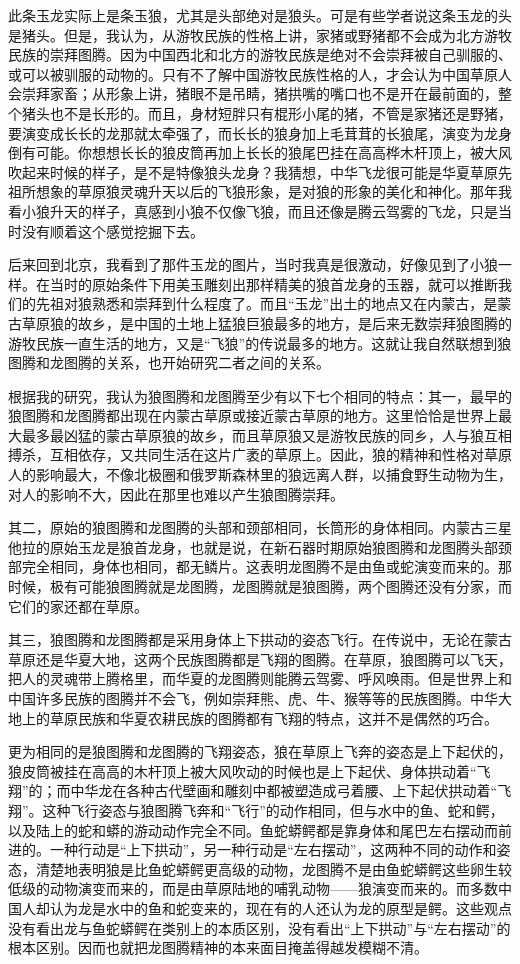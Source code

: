 \par 此条玉龙实际上是条玉狼，尤其是头部绝对是狼头。可是有些学者说这条玉龙的头是猪头。但是，我认为，从游牧民族的性格上讲，家猪或野猪都不会成为北方游牧民族的崇拜图腾。因为中国西北和北方的游牧民族是绝对不会崇拜被自己驯服的、或可以被驯服的动物的。只有不了解中国游牧民族性格的人，才会认为中国草原人会崇拜家畜；从形象上讲，猪眼不是吊睛，猪拱嘴的嘴口也不是开在最前面的，整个猪头也不是长形的。而且，身材短胖只有棍形小尾的猪，不管是家猪还是野猪，要演变成长长的龙那就太牵强了，而长长的狼身加上毛茸茸的长狼尾，演变为龙身倒有可能。你想想长长的狼皮筒再加上长长的狼尾巴挂在高高桦木杆顶上，被大风吹起来时候的样子，是不是特像狼头龙身？我猜想，中华飞龙很可能是华夏草原先祖所想象的草原狼灵魂升天以后的飞狼形象，是对狼的形象的美化和神化。那年我看小狼升天的样子，真感到小狼不仅像飞狼，而且还像是腾云驾雾的飞龙，只是当时没有顺着这个感觉挖掘下去。
\par 后来回到北京，我看到了那件玉龙的图片，当时我真是很激动，好像见到了小狼一样。在当时的原始条件下用美玉雕刻出那样精美的狼首龙身的玉器，就可以推断我们的先祖对狼熟悉和崇拜到什么程度了。而且“玉龙”出土的地点又在内蒙古，是蒙古草原狼的故乡，是中国的土地上猛狼巨狼最多的地方，是后来无数崇拜狼图腾的游牧民族一直生活的地方，又是“飞狼”的传说最多的地方。这就让我自然联想到狼图腾和龙图腾的关系，也开始研究二者之间的关系。
\par 根据我的研究，我认为狼图腾和龙图腾至少有以下七个相同的特点：其一，最早的狼图腾和龙图腾都出现在内蒙古草原或接近蒙古草原的地方。这里恰恰是世界上最大最多最凶猛的蒙古草原狼的故乡，而且草原狼又是游牧民族的同乡，人与狼互相搏杀，互相依存，又共同生活在这片广袤的草原上。因此，狼的精神和性格对草原人的影响最大，不像北极圈和俄罗斯森林里的狼远离人群，以捕食野生动物为生，对人的影响不大，因此在那里也难以产生狼图腾崇拜。
\par 其二，原始的狼图腾和龙图腾的头部和颈部相同，长筒形的身体相同。内蒙古三星他拉的原始玉龙是狼首龙身，也就是说，在新石器时期原始狼图腾和龙图腾头部颈部完全相同，身体也相同，都无鳞片。这表明龙图腾不是由鱼或蛇演变而来的。那时候，极有可能狼图腾就是龙图腾，龙图腾就是狼图腾，两个图腾还没有分家，而它们的家还都在草原。
\par 其三，狼图腾和龙图腾都是采用身体上下拱动的姿态飞行。在传说中，无论在蒙古草原还是华夏大地，这两个民族图腾都是飞翔的图腾。在草原，狼图腾可以飞天，把人的灵魂带上腾格里，而华夏的龙图腾则能腾云驾雾、呼风唤雨。但是世界上和中国许多民族的图腾并不会飞，例如崇拜熊、虎、牛、猴等等的民族图腾。中华大地上的草原民族和华夏农耕民族的图腾都有飞翔的特点，这并不是偶然的巧合。
\par 更为相同的是狼图腾和龙图腾的飞翔姿态，狼在草原上飞奔的姿态是上下起伏的，狼皮筒被挂在高高的木杆顶上被大风吹动的时候也是上下起伏、身体拱动着“飞翔”的；而中华龙在各种古代壁画和雕刻中都被塑造成弓着腰、上下起伏拱动着“飞翔”。这种飞行姿态与狼图腾飞奔和“飞行”的动作相同，但与水中的鱼、蛇和鳄，以及陆上的蛇和蟒的游动动作完全不同。鱼蛇蟒鳄都是靠身体和尾巴左右摆动而前进的。一种行动是“上下拱动”，另一种行动是“左右摆动”，这两种不同的动作和姿态，清楚地表明狼是比鱼蛇蟒鳄更高级的动物，龙图腾不是由鱼蛇蟒鳄这些卵生较低级的动物演变而来的，而是由草原陆地的哺乳动物——狼演变而来的。而多数中国人却认为龙是水中的鱼和蛇变来的，现在有的人还认为龙的原型是鳄。这些观点没有看出龙与鱼蛇蟒鳄在类别上的本质区别，没有看出“上下拱动”与“左右摆动”的根本区别。因而也就把龙图腾精神的本来面目掩盖得越发模糊不清。
